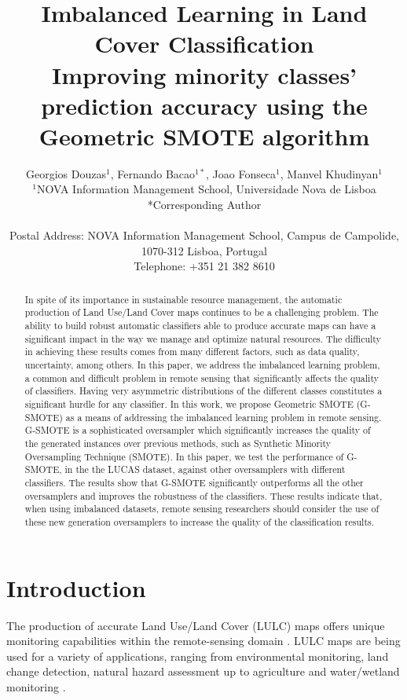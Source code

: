 \documentclass[parskip=full]{scrartcl}
\title{Imbalanced Learning in Land Cover Classification  \\ \LARGE{Improving minority classes' prediction accuracy using the Geometric SMOTE algorithm}}
\author{Georgios Douzas\(^{1}\), Fernando Bacao\(^{1*}\), Joao Fonseca\(^{1}\), Manvel Khudinyan\(^{1}\) 
	\\
	\small{\(^{1}\)NOVA Information Management School, Universidade Nova de Lisboa}
	\\
	\small{*Corresponding Author}
	\\
	\\
	\small{Postal Address: NOVA Information Management School, Campus de Campolide, 1070-312 Lisboa, Portugal}
	\\
	\small{Telephone: +351 21 382 8610}
}
\date{}
\begin{document}
\maketitle

\begin{abstract}
In spite of its importance in sustainable resource management, the automatic
production of Land Use/Land Cover maps continues to be a challenging problem.
The ability to build robust automatic classifiers able to produce accurate maps
can have a significant impact in the way we manage and optimize natural
resources. The difficulty in achieving these results comes from many different
factors, such as data quality, uncertainty, among others. In this paper, we
address the imbalanced learning problem, a common and difficult problem in
remote sensing that significantly affects the quality of classifiers. Having
very asymmetric distributions of the different classes constitutes a significant
hurdle for any classifier. In this work, we propose Geometric SMOTE (G-SMOTE) as
a means of addressing the imbalanced learning problem in remote sensing. G-SMOTE
is a sophisticated oversampler which significantly increases the quality of the
generated instances over previous methods, such as Synthetic Minority
Oversampling Technique (SMOTE). In this paper, we test the performance of
G-SMOTE, in the the LUCAS dataset, against other oversamplers with different
classifiers. The results show that G-SMOTE significantly outperforms all the
other oversamplers and improves the robustness of the classifiers. These results
indicate that, when using imbalanced datasets, remote sensing researchers should
consider the use of these new generation oversamplers to increase the quality of
the classification results.
\end{abstract}

\section{Introduction}
The production of accurate Land Use/Land Cover (LULC) maps offers unique
monitoring capabilities within the remote-sensing domain \cite{Mellor2015}. LULC
maps are being used for a variety of applications, ranging from environmental
monitoring, land change detection, natural hazard assessment up to agriculture
and water/wetland monitoring \cite{Khatami2016}.
\end{document}

